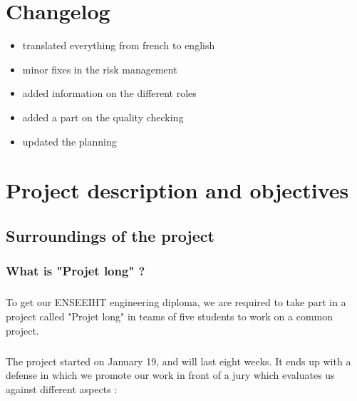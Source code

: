 \documentclass{report}
\begin{document}
\chapter{Changelog}

\vspace{4mm}
\begin{itemize}
\item translated everything from french to english\vspace{1mm}
\item minor fixes in the risk management\vspace{1mm}
\item added information on the different roles\vspace{1mm}
\item added a part on the quality checking\vspace{1mm}
\item updated the planning\vspace{1mm}
\end{itemize}

\chapter{Project description and objectives}

\section{Surroundings of the project}

\subsection{What is "Projet long" ?}

\paragraph{}
\hspace{4mm}\textnormal{To get our ENSEEIHT engineering diploma, we are required to take part in 
a project called "Projet long" in teams of five students to work 
on a common project.}

\paragraph{}
\hspace{4mm}\textnormal{The project started on January 19, and will last eight weeks. It ends up with 
a defense in which we promote our work in front of a jury which evaluates 
us against different aspects :}
\end{document}
